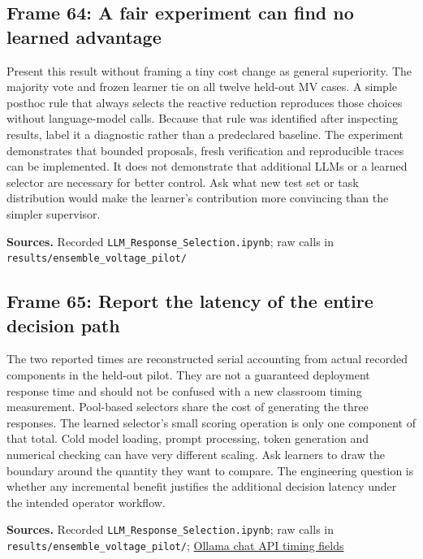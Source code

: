 \documentclass[11pt]{article}
\begin{document}
\subsection*{Frame 64: A fair experiment can find no learned advantage}
Present this result without framing a tiny cost change as general superiority. The majority vote and frozen learner tie on all twelve held-out MV cases. A simple posthoc rule that always selects the reactive reduction reproduces those choices without language-model calls. Because that rule was identified after inspecting results, label it a diagnostic rather than a predeclared baseline. The experiment demonstrates that bounded proposals, fresh verification and reproducible traces can be implemented. It does not demonstrate that additional LLMs or a learned selector are necessary for better control. Ask what new test set or task distribution would make the learner's contribution more convincing than the simpler supervisor.\par
\par\nopagebreak\begin{minipage}{\linewidth}{\footnotesize\color{slate}\textbf{Sources.} Recorded \texttt{LLM\_Response\_Selection.ipynb}; raw calls in \texttt{results/ensemble\_voltage\_pilot/}\par}\end{minipage}\par\medskip
\subsection*{Frame 65: Report the latency of the entire decision path}
The two reported times are reconstructed serial accounting from actual recorded components in the held-out pilot. They are not a guaranteed deployment response time and should not be confused with a new classroom timing measurement. Pool-based selectors share the cost of generating the three responses. The learned selector's small scoring operation is only one component of that total. Cold model loading, prompt processing, token generation and numerical checking can have very different scaling. Ask learners to draw the boundary around the quantity they want to compare. The engineering question is whether any incremental benefit justifies the additional decision latency under the intended operator workflow.\par
\par\nopagebreak\begin{minipage}{\linewidth}{\footnotesize\color{slate}\textbf{Sources.} Recorded \texttt{LLM\_Response\_Selection.ipynb}; raw calls in \texttt{results/ensemble\_voltage\_pilot/}; \href{https://docs.ollama.com/api/chat}{Ollama chat API timing fields}\par}\end{minipage}\par\medskip
\end{document}
